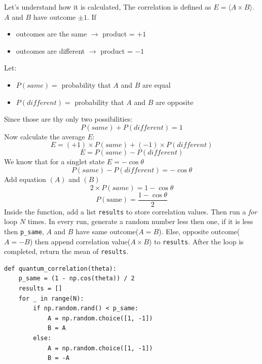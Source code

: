 \documentclass[14pt,a4paper]{extarticle}
\begin{document}
\begin{enumerate}
Let's understand how it is calculated, The correlation is defined as $E = \langle A \times B \rangle$. $A$ and $B$ have outcome $\pm1$. If
\begin{itemize}
\item outcomes are the same $\rightarrow$ product = $+1$
\item outcomes are different $\rightarrow$ product = $-1$
\end{itemize}
Let:
\begin{itemize}
\item $P(same)=$ probability that $A$ and $B$ are equal
\item $P(different)=$ probability that $A$ and $B$ are opposite
\end{itemize}
Since those are thy only two possibilities:
{
\renewcommand{\theequation}{\Alph{equation}}
\setcounter{equation}{0}
\begin{equation}
P(same)+P(different)=1
\end{equation}
}
Now calculate the average $E$:
\setcounter{equation}{0}
\begin{equation}
E=(+1) \times P(same) + (-1) \times P(different)
\end{equation}
\begin{equation}
E=P(same) - P(different)
\end{equation}
We know that for a singlet state $E = - \cos \theta$
{
\renewcommand{\theequation}{\Alph{equation}}
\setcounter{equation}{1}
\begin{equation}
P(same) - P(different) = - \cos \theta
\end{equation}
}
Add equation $(A)$ and $(B)$
\setcounter{equation}{0}
\begin{equation}
2 \times P(same) = 1 - \cos \theta
\end{equation}
\begin{equation}
P(\text{same}) = \frac{1 - \cos \theta}{2}
\end{equation}
Inside the function, add a list \texttt{results} to store correlation values. Then run a \textit{for} loop $N$ times. In every run, generate a random number less then one, if it is less then \texttt{p\_same}, $A$ and $B$ have same outcome($A=B$). Else, opposite outcome($A=-B$) then append correlation value($A \times B$) to \texttt{results}. After the loop is completed, return the mean of \texttt{results}.
\begin{lstlisting}
def quantum_correlation(theta):
    p_same = (1 - np.cos(theta)) / 2
    results = []
    for _ in range(N):
        if np.random.rand() < p_same:
            A = np.random.choice([1, -1])
            B = A
        else:
            A = np.random.choice([1, -1])
            B = -A


\end{lstlisting}
\end{enumerate}
\end{document}
